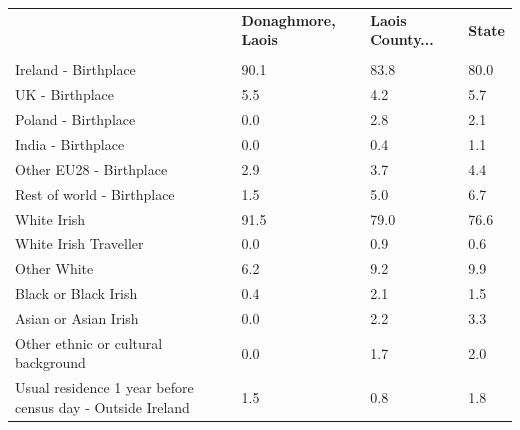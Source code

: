 \documentclass{article}
\begin{document}
\pagebreak
\begin{table}[h]	
\centering
		\begin{tabular}{KTTT}
  \hline
& \textbf{Donaghmore, Laois} & \textbf{Laois County...} & \textbf{State}\\ 
  \hline
    \\ 
    \hline
Ireland - Birthplace & 90.1& 83.8& 80.0\\
UK - Birthplace & 5.5& 4.2& 5.7\\
Poland - Birthplace & 0.0& 2.8& 2.1\\
India - Birthplace & 0.0& 0.4& 1.1\\
Other EU28 - Birthplace & 2.9& 3.7& 4.4\\
Rest of world - Birthplace & 1.5& 5.0& 6.7\\
    \hline
White Irish & 91.5& 79.0& 76.6\\
White Irish Traveller & 0.0& 0.9& 0.6\\
Other White & 6.2& 9.2& 9.9\\
Black or Black Irish & 0.4& 2.1& 1.5\\
Asian or Asian Irish & 0.0& 2.2& 3.3\\
Other ethnic or cultural background & 0.0& 1.7& 2.0\\
    \hline
Usual residence 1 year before census day - Outside Ireland & 1.5& 0.8& 1.8\\


\end{tabular}
\end{table}
\end{document}
